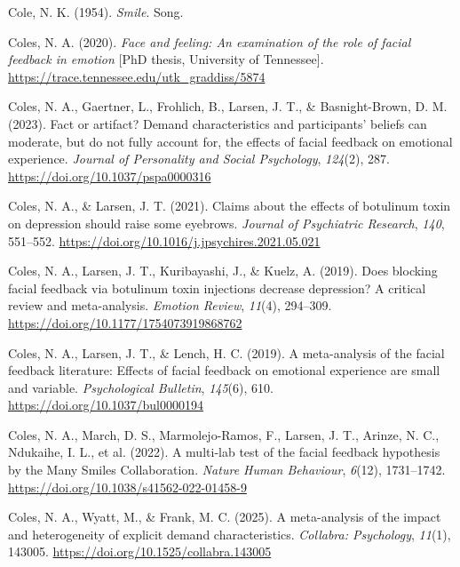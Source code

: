 \documentclass[
  letterpaper,
  DIV=11,
  numbers=noendperiod]{scrartcl}
\newlength{\cslhangindent}
\newenvironment{CSLReferences}[2] %
 {\begin{list}{}{%
  \setlength{\itemindent}{0pt}
  \setlength{\leftmargin}{0pt}
  \setlength{\parsep}{0pt}
  \ifodd #1
   \setlength{\leftmargin}{\cslhangindent}
   \setlength{\itemindent}{-1\cslhangindent}
  \fi
  \setlength{\itemsep}{#2\baselineskip}}}
 {\end{list}}
\begin{document}
\begin{CSLReferences}{1}{0}
Cole, N. K. (1954). \emph{Smile}. Song.

Coles, N. A. (2020). \emph{Face and feeling: An examination of the role
of facial feedback in emotion} {[}PhD thesis, University of
Tennessee{]}. \url{https://trace.tennessee.edu/utk_graddiss/5874}

Coles, N. A., Gaertner, L., Frohlich, B., Larsen, J. T., \&
Basnight-Brown, D. M. (2023). Fact or artifact? Demand characteristics
and participants' beliefs can moderate, but do not fully account for,
the effects of facial feedback on emotional experience. \emph{Journal of
Personality and Social Psychology}, \emph{124}(2), 287.
\url{https://doi.org/10.1037/pspa0000316}

Coles, N. A., \& Larsen, J. T. (2021). Claims about the effects of
botulinum toxin on depression should raise some eyebrows. \emph{Journal
of Psychiatric Research}, \emph{140}, 551--552.
\url{https://doi.org/10.1016/j.jpsychires.2021.05.021}

Coles, N. A., Larsen, J. T., Kuribayashi, J., \& Kuelz, A. (2019). Does
blocking facial feedback via botulinum toxin injections decrease
depression? A critical review and meta-analysis. \emph{Emotion Review},
\emph{11}(4), 294--309. \url{https://doi.org/10.1177/1754073919868762}

Coles, N. A., Larsen, J. T., \& Lench, H. C. (2019). A meta-analysis of
the facial feedback literature: Effects of facial feedback on emotional
experience are small and variable. \emph{Psychological Bulletin},
\emph{145}(6), 610. \url{https://doi.org/10.1037/bul0000194}

{Coles, N. A., March, D. S., Marmolejo-Ramos, F., Larsen, J. T., Arinze,
N. C., Ndukaihe, I. L., et al.} (2022). A multi-lab test of the facial
feedback hypothesis by the {Many Smiles Collaboration}. \emph{Nature
Human Behaviour}, \emph{6}(12), 1731--1742.
\url{https://doi.org/10.1038/s41562-022-01458-9}

Coles, N. A., Wyatt, M., \& Frank, M. C. (2025). A meta-analysis of the
impact and heterogeneity of explicit demand characteristics.
\emph{Collabra: Psychology}, \emph{11}(1), 143005.
\url{https://doi.org/10.1525/collabra.143005}


\end{CSLReferences}
\end{document}
